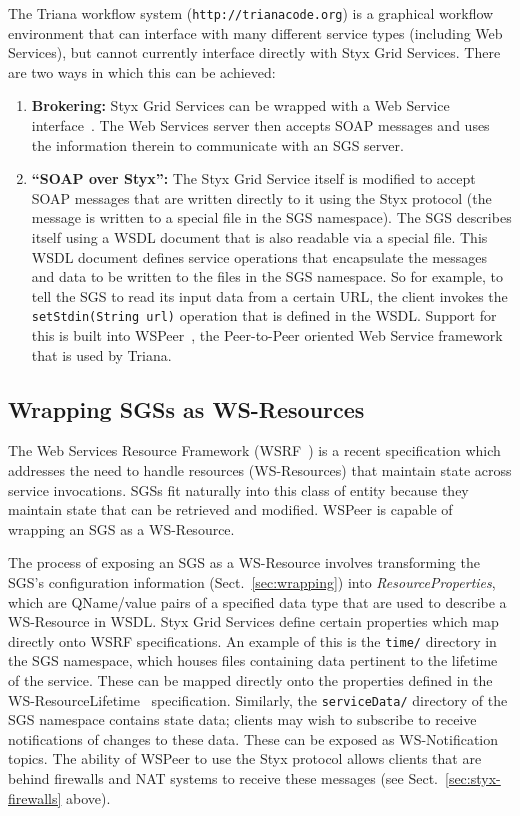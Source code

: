 \documentclass{llncs}
\begin{document}
The Triana workflow system ({\tt http://trianacode.org}) is a graphical workflow environment that can interface with many different service types (including Web Services), but cannot currently interface directly with Styx Grid Services.  There are two ways in which this can be achieved:
\begin{enumerate}
	\item {\bf Brokering:} Styx Grid Services can be wrapped with a Web Service interface~\cite{blower:2005}.  The Web Services server then accepts SOAP messages and uses the information therein to communicate with an SGS server.
	\item {\bf ``SOAP over Styx'':} The Styx Grid Service itself is modified to accept SOAP messages that are written directly to it using the Styx protocol (the message is written to a special file in the SGS namespace).  The SGS describes itself using a WSDL document that is also readable via a special file.  This WSDL document defines service operations that encapsulate the messages and data to be written to the files in the SGS namespace.  So for example, to tell the SGS to read its input data from a certain URL, the client invokes the {\tt setStdin(String url)} operation that is defined in the WSDL.  Support for this is built into WSPeer~\cite{wspeer}, the Peer-to-Peer oriented Web Service framework that is used by Triana.
\end{enumerate}

\subsection{Wrapping SGSs as WS-Resources}\label{subsec:ws-resources}

The Web Services Resource Framework (WSRF~\cite{wsrf}) is a recent specification which addresses the need to handle resources (WS-Resources) that maintain state across service invocations.  SGSs fit naturally into this class of entity because they maintain state that can be retrieved and modified.  WSPeer is capable of wrapping an SGS as a WS-Resource.

The process of exposing an SGS as a WS-Resource involves transforming the SGS's configuration information (Sect.~\ref{sec:wrapping}) into {\em ResourceProperties\/}, which are QName/value pairs of a specified data type that are used to describe a WS-Resource in WSDL.  Styx Grid Services define certain properties which map directly onto WSRF specifications.  An example of this is the {\tt time/} directory in the SGS namespace, which houses files containing data pertinent to the lifetime of the service.  These can be mapped directly onto the properties defined in the WS-ResourceLifetime~\cite{wsrf-lifetime} specification.  Similarly, the {\tt serviceData/} directory of the SGS namespace contains state data; clients may wish to subscribe to receive notifications of changes to these data.  These can be exposed as WS-Notification~\cite{wsrf-notification} topics.  The ability of WSPeer to use the Styx protocol allows clients that are behind firewalls and NAT systems to receive these messages (see Sect.~\ref{sec:styx-firewalls} above).
\end{document}
